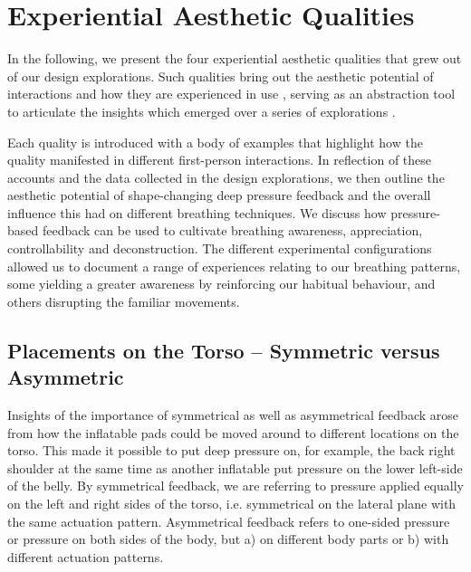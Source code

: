 
\section{Experiential Aesthetic Qualities}
\label{sec:aesthetic_qualities}

In the following, we present the four experiential aesthetic qualities that grew out of our design explorations. Such qualities bring out the aesthetic potential of interactions and how they are experienced in use \cite{lowgren_2009}, serving as an abstraction tool to articulate the insights which emerged over a series of explorations \cite{stahl_evocative_2014}.

Each quality is introduced with a body of examples that highlight how the quality manifested in different first-person interactions. In reflection of these accounts and the data collected in the design explorations, we then outline the aesthetic potential of shape-changing deep pressure feedback and the overall influence this had on different breathing techniques. We discuss how pressure-based feedback can be used to cultivate breathing awareness, appreciation, controllability and deconstruction. The different experimental configurations allowed us to document a range of experiences relating to our breathing patterns, some yielding a greater awareness by reinforcing our habitual behaviour, and others disrupting the familiar movements.
% 

\subsection{Placements on the Torso -- Symmetric versus Asymmetric}

Insights of the importance of symmetrical as well as asymmetrical feedback arose from how the inflatable pads could be moved around to different locations on the torso. This made it possible to put deep pressure on, for example, the back right shoulder at the same time as another inflatable put pressure on the lower left-side of the belly. By symmetrical feedback, we are referring to pressure applied equally on the left and right sides of the torso, i.e. symmetrical on the lateral plane with the same actuation pattern. Asymmetrical feedback refers to one-sided pressure or pressure on both sides of the body, but a) on different body parts or b) with different actuation patterns.


